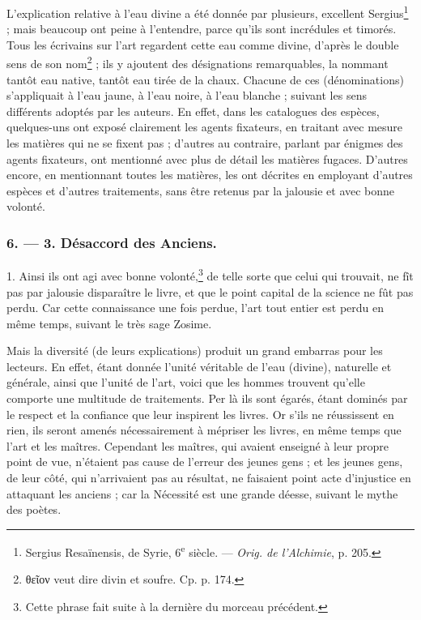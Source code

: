 \documentclass[a4paper, 11pt, oneside, polutonikogreek, french]{article}
\begin{document}
L'explication relative à l'eau divine a été donnée par plusieurs, excellent Sergius\footnote{Sergius Resaïnensis, de Syrie, 6\textsuperscript{e} siècle. --- \emph{Orig. de l'Alchimie}, p. 205.} ; mais beaucoup ont peine à l'entendre, parce qu'ils sont incrédules et timorés. Tous les écrivains sur l'art regardent cette eau comme divine, d'après le double sens de son nom\footnote{θεῖον veut dire divin et soufre. Cp. p. 174.} ; ils y ajoutent des désignations remarquables, la nommant tantôt eau native, tantôt eau tirée de la chaux. Chacune de ces (dénominations) s'appliquait à l'eau jaune, à l'eau noire, à l'eau blanche ; suivant les sens différents adoptés par les auteurs. En effet, dans les catalogues des espèces, quelques-uns ont exposé clairement les agents fixateurs, en traitant avec mesure les matières qui ne se fixent pas ; d'autres au contraire, parlant par énigmes des agents fixateurs, ont mentionné avec plus de détail les matières fugaces. D'autres encore, en mentionnant toutes les matières, les ont décrites en employant d'autres espèces et d'autres traitements, sans être retenus par la jalousie et avec bonne volonté.

\bigskip
\centerline{\EightStarTaper}
\centerline{\EightStarTaper\EightStarTaper}
\bigskip

\subsubsection{6. --- 3. Désaccord des Anciens.}

1. Ainsi ils ont agi avec bonne volonté,\footnote{Cette phrase fait suite à la dernière du morceau précédent.} de telle sorte que celui qui trouvait, ne fît pas par jalousie disparaître le livre, et que le point capital de la science ne fût pas perdu. Car cette connaissance une fois perdue, l'art tout entier est perdu en même temps, suivant le très sage Zosime.

Mais la diversité (de leurs explications) produit un grand embarras pour les lecteurs. En effet, étant donnée l'unité véritable de l'eau (divine), naturelle et générale, ainsi que l'unité de l'art, voici que les hommes trouvent qu'elle comporte une multitude de traitements. Per là ils sont égarés, étant dominés par le respect et la confiance que leur inspirent les livres. Or s'ils ne réussissent en rien, ils seront amenés nécessairement à mépriser les livres, en même temps que l'art et les maîtres. Cependant les maîtres, qui avaient enseigné à leur propre point de vue, n'étaient pas cause de l'erreur des jeunes gens ; et les jeunes gens, de leur côté, qui n'arrivaient pas au résultat, ne faisaient point acte d'injustice en attaquant les anciens ; car la Nécessité est une grande déesse, suivant le mythe des poètes.
\end{document}
